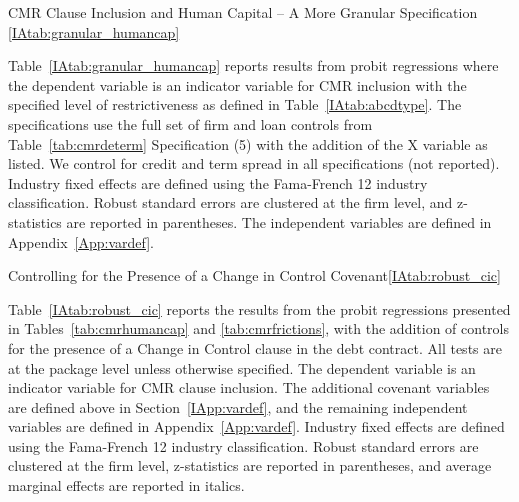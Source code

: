 \documentclass[12pt]{article}
\begin{document}
\begin{appendices}
\begin{singlespace}
\begin{papertable}{CMR Clause Inclusion and Human Capital -- A More Granular Specification} {\ref{IAtab:granular_humancap}}{}
    \label{IAtab:granular_humancap}

    Table~\ref{IAtab:granular_humancap} reports results from probit regressions where the dependent variable is an indicator variable for CMR inclusion with the specified level of restrictiveness as defined in Table~\ref{IAtab:abcdtype}.
    The specifications use the full set of firm and loan controls from Table~\ref{tab:cmrdeterm} Specification (5) with the addition of the X variable as listed.
    We control for credit and term spread in all specifications (not reported).
    Industry fixed effects are defined using the Fama-French 12 industry classification.
    Robust standard errors are clustered at the firm level, and z-statistics are reported in parentheses.
    The independent variables are defined in Appendix~\ref{App:vardef}.
    \postamblesig

    \startdata
    
\end{papertable}




\begin{papertable}{Controlling for the Presence of a Change in Control Covenant}{\ref{IAtab:robust_cic}}{}
  \label{IAtab:robust_cic}

  Table~\ref{IAtab:robust_cic} reports the results from the probit regressions presented in Tables~\ref{tab:cmrhumancap} and \ref{tab:cmrfrictions}, with the addition of controls for the presence of a Change in Control clause in the debt contract.
  All tests are at the package level unless otherwise specified.
  The dependent variable is an indicator variable for CMR clause inclusion.
  The additional covenant variables are defined above in Section~\ref{IApp:vardef}, and the remaining independent variables are defined in Appendix~\ref{App:vardef}.
  Industry fixed effects are defined using the Fama-French 12 industry classification.
  Robust standard errors are clustered at the firm level, z-statistics are reported in parentheses, and average marginal effects are reported in italics.
  \postamblesig


\end{papertable}
\end{singlespace}
\end{appendices}
\end{document}
